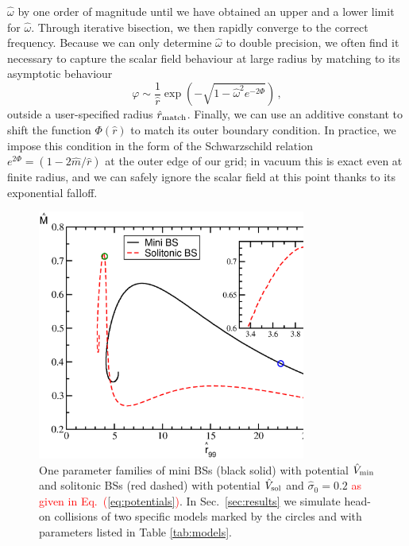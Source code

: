 \documentclass[]{iopart}
\newcommand{\new}[1]{\textcolor{red}{#1}}
\begin{document}
$\hat{\omega}$ by one order of magnitude until we have obtained an
upper and a lower limit for $\hat{\omega}$. Through iterative
bisection, we then rapidly converge to the correct frequency. Because
we can only determine $\hat{\omega}$ to double precision, we often
find it necessary to capture the scalar field behaviour at large
radius by matching to its asymptotic behaviour
%
\begin{equation}
  \varphi \sim \frac{1}{\hat{r}}
  \exp\left( {-\sqrt{1-\hat{\omega}^2e^{-2\Phi}}}\right)\,,
\end{equation}
%
outside a user-specified radius $\hat{r}_{\rm match}$. Finally, we
can use an additive constant to shift the function $\Phi(\hat{r})$
to match its outer boundary condition. In practice, we impose this
condition in the form of the Schwarzschild relation
$e^{2\Phi}=(1-2\hat{m}/\hat{r})$ at the outer edge of our grid; in
vacuum this is exact even at finite radius, and we can safely ignore
the scalar field at this point thanks to its exponential falloff.
%
\begin{figure}[b]
    \centering
    \includegraphics[width=250pt]{statBS.eps}
    \caption{One parameter families of mini BSs (black solid) with
    potential $\hat{V}_{\rm min}$ and solitonic
    BSs (red dashed) with potential $\hat{V}_{\rm sol}$ and
    $\hat{\sigma}_0=0.2$ \new{as given in Eq.~(\ref{eq:potentials})}. In
    Sec.~\ref{sec:results} we simulate head-on collisions of two
    specific models marked by the circles and with parameters listed
    in Table \ref{tab:models}.
    }
    \label{fig:statBS}
\end{figure}
%
\end{document}
